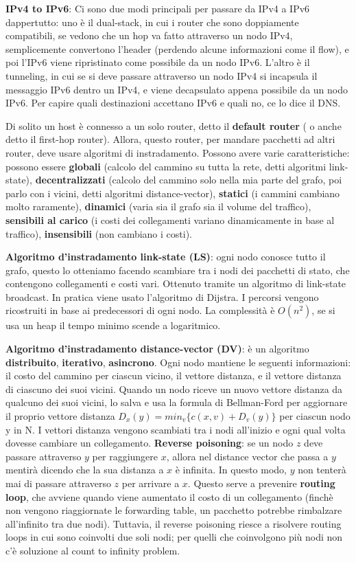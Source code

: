 \documentclass[a4paper,10pt]{article} %
\renewcommand{\b}[1]{%
    {\textbf{#1}}}
\begin{document}
\b{IPv4 to IPv6}: Ci sono due modi principali per passare da IPv4 a IPv6 dappertutto: uno è il dual-stack, in cui i router che sono doppiamente compatibili, se vedono che un hop va fatto attraverso un nodo IPv4, semplicemente convertono l'header (perdendo alcune informazioni come il flow), e poi l'IPv6 viene ripristinato come possibile da un nodo IPv6. L'altro è il tunneling, in cui se si deve passare attraverso un nodo IPv4 si incapsula il messaggio IPv6 dentro un IPv4, e viene decapsulato appena possibile da un nodo IPv6. Per capire quali destinazioni accettano IPv6 e quali no, ce lo dice il DNS.

Di solito un host è connesso a un solo router, detto il \b{default router} ( o anche detto il first-hop router). Allora, questo router, per mandare pacchetti ad altri router, deve usare algoritmi di instradamento. Possono avere varie caratteristiche: possono essere \b{globali} (calcolo del cammino su tutta la rete, detti algoritmi link-state), \b{decentralizzati} (calcolo del cammino solo nella mia parte del grafo, poi parlo con i vicini, detti algoritmi distance-vector), \b{statici} (i cammini cambiano molto raramente), \b{dinamici} (varia sia il grafo sia il volume del traffico), \b{sensibili al carico} (i costi dei collegamenti variano dinamicamente in base al traffico), \b{insensibili} (non cambiano i costi).

\b{Algoritmo d'instradamento link-state (LS)}: ogni nodo conosce tutto il grafo, questo lo otteniamo facendo scambiare tra i nodi dei pacchetti di stato, che contengono collegamenti e costi vari. Ottenuto tramite un algoritmo di link-state broadcast. In pratica viene usato l'algoritmo di Dijstra. I percorsi vengono ricostruiti in base ai predecessori di ogni nodo. La complessità è $O(n^2)$, se si usa un heap il tempo minimo scende a logaritmico.

\b{Algoritmo d'instradamento distance-vector (DV)}: è un algoritmo \b{distribuito}, \b{iterativo}, \b{asincrono}. Ogni nodo mantiene le seguenti informazioni: il costo del cammino per ciascun vicino, il vettore distanza, e il vettore distanza di ciascuno dei suoi vicini. Quando un nodo riceve un nuovo vettore distanza da qualcuno dei suoi vicini, lo salva e usa la formula di Bellman-Ford per aggiornare il proprio vettore distanza $D_x(y) = min_v \{ c(x, v) + D_v(y) \}$ per ciascun nodo y in N. I vettori distanza vengono scambiati tra i nodi all'inizio e ogni qual volta dovesse cambiare un collegamento. \b{Reverse poisoning}: se un nodo $z$ deve passare attraverso $y$ per raggiungere $x$, allora nel distance vector che passa a $y$ mentirà dicendo che la sua distanza a $x$ è infinita. In questo modo, $y$ non tenterà mai di passare attraverso $z$ per arrivare a $x$.  Questo serve a prevenire \b{routing loop}, che avviene quando viene aumentato il costo di un collegamento (finchè non vengono riaggiornate le forwarding table, un pacchetto potrebbe rimbalzare all'infinito tra due nodi). Tuttavia, il reverse poisoning riesce a risolvere routing loops in cui sono coinvolti due soli nodi; per quelli che coinvolgono più nodi non c'è soluzione al count to infinity problem.
\end{document}

